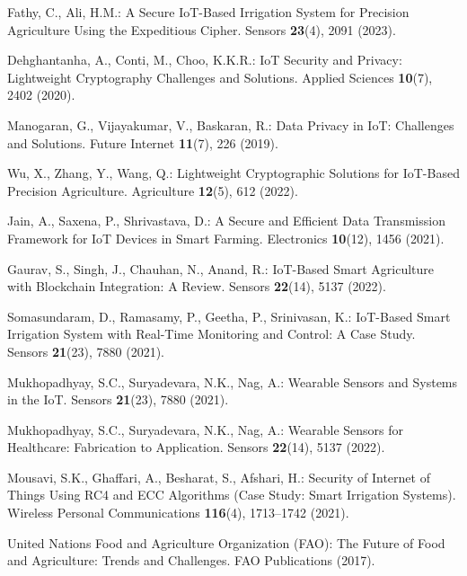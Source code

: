 \documentclass[runningheads]{llncs}
\begin{document}
\begin{thebibliography}{23}
 Fathy, C., Ali, H.M.: A Secure IoT-Based Irrigation System for Precision Agriculture Using the Expeditious Cipher. Sensors \textbf{23}(4), 2091 (2023). 

 Dehghantanha, A., Conti, M., Choo, K.K.R.: IoT Security and Privacy: Lightweight Cryptography Challenges and Solutions. Applied Sciences \textbf{10}(7), 2402 (2020). 

 Manogaran, G., Vijayakumar, V., Baskaran, R.: Data Privacy in IoT: Challenges and Solutions. Future Internet \textbf{11}(7), 226 (2019). 

 Wu, X., Zhang, Y., Wang, Q.: Lightweight Cryptographic Solutions for IoT-Based Precision Agriculture. Agriculture \textbf{12}(5), 612 (2022). 

 Jain, A., Saxena, P., Shrivastava, D.: A Secure and Efficient Data Transmission Framework for IoT Devices in Smart Farming. Electronics \textbf{10}(12), 1456 (2021). 

 Gaurav, S., Singh, J., Chauhan, N., Anand, R.: IoT-Based Smart Agriculture with Blockchain Integration: A Review. Sensors \textbf{22}(14), 5137 (2022). 

 Somasundaram, D., Ramasamy, P., Geetha, P., Srinivasan, K.: IoT-Based Smart Irrigation System with Real-Time Monitoring and Control: A Case Study. Sensors \textbf{21}(23), 7880 (2021). 

 Mukhopadhyay, S.C., Suryadevara, N.K., Nag, A.: Wearable Sensors and Systems in the IoT. Sensors \textbf{21}(23), 7880 (2021). 

 Mukhopadhyay, S.C., Suryadevara, N.K., Nag, A.: Wearable Sensors for Healthcare: Fabrication to Application. Sensors \textbf{22}(14), 5137 (2022). 

 Mousavi, S.K., Ghaffari, A., Besharat, S., Afshari, H.: Security of Internet of Things Using RC4 and ECC Algorithms (Case Study: Smart Irrigation Systems). Wireless Personal Communications \textbf{116}(4), 1713–1742 (2021). 

 United Nations Food and Agriculture Organization (FAO): The Future of Food and Agriculture: Trends and Challenges. FAO Publications (2017).


\end{thebibliography}
\end{document}
